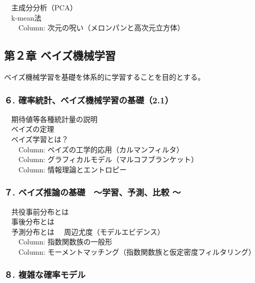\documentclass[
]{ltjarticle}
\begin{document}
　主成分分析（PCA）\\
　k-mean法\\
　　Column: 次元の呪い（メロンパンと高次元立方体）

\hypertarget{ux7b2cuxff12ux7ae0-ux30d9ux30a4ux30baux6a5fux68b0ux5b66ux7fd2}{%
\subsection{第２章
ベイズ機械学習}\label{ux7b2cuxff12ux7ae0-ux30d9ux30a4ux30baux6a5fux68b0ux5b66ux7fd2}}

ベイズ機械学習を基礎を体系的に学習することを目的とする。

\hypertarget{ux78baux7387ux7d71ux8a08ux30d9ux30a4ux30baux6a5fux68b0ux5b66ux7fd2ux306eux57faux790e2.1}{%
\subsubsection{６.
確率統計、ベイズ機械学習の基礎（2.1）}\label{ux78baux7387ux7d71ux8a08ux30d9ux30a4ux30baux6a5fux68b0ux5b66ux7fd2ux306eux57faux790e2.1}}

　期待値等各種統計量の説明\\
　ベイズの定理\\
　ベイズ学習とは？\\
　　Column: ベイズの工学的応用（カルマンフィルタ）\\
　　Column: グラフィカルモデル（マルコフブランケット）\\
　　Column: 情報理論とエントロピー

\hypertarget{ux30d9ux30a4ux30baux63a8ux8ad6ux306eux57faux790e-ux5b66ux7fd2ux4e88ux6e2cux6bd4ux8f03}{%
\subsubsection{７. ベイズ推論の基礎　〜学習、予測、比較
〜}\label{ux30d9ux30a4ux30baux63a8ux8ad6ux306eux57faux790e-ux5b66ux7fd2ux4e88ux6e2cux6bd4ux8f03}}

　共役事前分布とは\\
　事後分布とは\\
　予測分布とは 　周辺尤度（モデルエビデンス）\\
　　Column: 指数関数族の一般形\\
　　Column: モーメントマッチング（指数関数族と仮定密度フィルタリング）

\hypertarget{ux8907ux96d1ux306aux78baux7387ux30e2ux30c7ux30eb}{%
\subsubsection{８.
複雑な確率モデル}\label{ux8907ux96d1ux306aux78baux7387ux30e2ux30c7ux30eb}}
\end{document}
